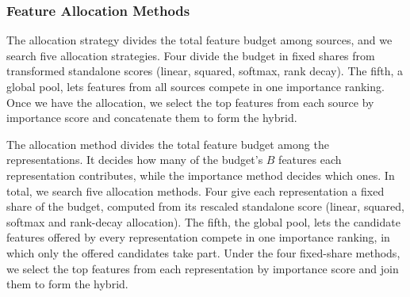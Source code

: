 \subsubsection{Feature Allocation Methods}

The allocation strategy divides the total feature budget among sources, and we search five allocation strategies. Four divide the budget in fixed shares from transformed standalone scores (linear, squared, softmax, rank decay). The fifth, a global pool, lets features from all sources compete in one importance ranking. Once we have the allocation, we select the top features from each source by importance score and concatenate them to form the hybrid.

The allocation method divides the total feature budget among the representations. It decides how many of the budget's $B$ features each representation contributes, while the importance method decides which ones. In total, we search five allocation methods. Four give each representation a fixed share of the budget, computed from its rescaled standalone score (linear, squared, softmax and rank-decay allocation). The fifth, the global pool, lets the candidate features offered by every representation compete in one importance ranking, in which only the offered candidates take part. Under the four fixed-share methods, we select the top features from each representation by importance score and join them to form the hybrid.





